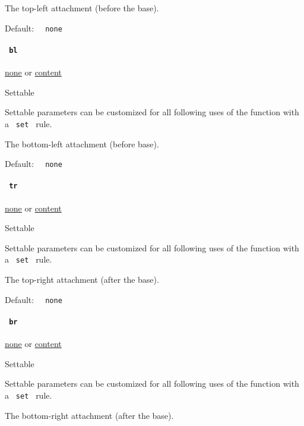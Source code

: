 The top-left attachment (before the base).

Default: \texttt{\ }{\texttt{\ none\ }}\texttt{\ }

\paragraph{\texorpdfstring{\texttt{\ bl\ }}{ bl }}\label{functions-attach-bl}

\href{/docs/reference/foundations/none/}{none} {or}
\href{/docs/reference/foundations/content/}{content}

{{ Settable }}

\label{functions-attach-bl-settable-tooltip}
Settable parameters can be customized for all following uses of the
function with a \texttt{\ set\ } rule.

The bottom-left attachment (before base).

Default: \texttt{\ }{\texttt{\ none\ }}\texttt{\ }

\paragraph{\texorpdfstring{\texttt{\ tr\ }}{ tr }}\label{functions-attach-tr}

\href{/docs/reference/foundations/none/}{none} {or}
\href{/docs/reference/foundations/content/}{content}

{{ Settable }}

\label{functions-attach-tr-settable-tooltip}
Settable parameters can be customized for all following uses of the
function with a \texttt{\ set\ } rule.

The top-right attachment (after the base).

Default: \texttt{\ }{\texttt{\ none\ }}\texttt{\ }

\paragraph{\texorpdfstring{\texttt{\ br\ }}{ br }}\label{functions-attach-br}

\href{/docs/reference/foundations/none/}{none} {or}
\href{/docs/reference/foundations/content/}{content}

{{ Settable }}

\label{functions-attach-br-settable-tooltip}
Settable parameters can be customized for all following uses of the
function with a \texttt{\ set\ } rule.

The bottom-right attachment (after the base).

